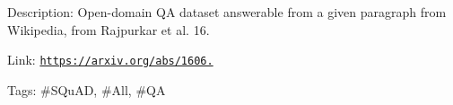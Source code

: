 Description\+: Open-\/domain QA dataset answerable from a given paragraph from Wikipedia, from Rajpurkar et al. \textquotesingle{}16.

Link\+: \href{https://arxiv.org/abs/1606.05250}{\tt https\+://arxiv.\+org/abs/1606.}

Tags\+: \#\+S\+Qu\+AD, \#\+All, \#\+QA 